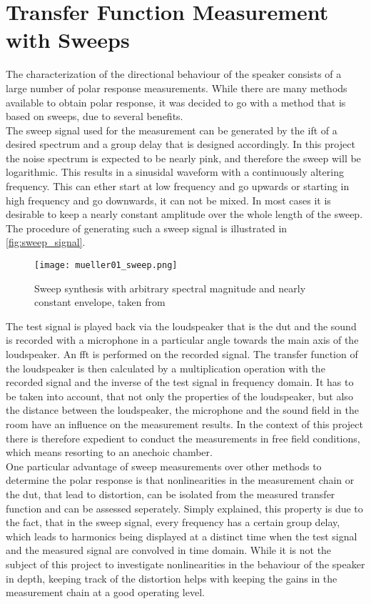 \section{Transfer Function Measurement with Sweeps}\label{sec:sweep_theorie}
The characterization of the directional behaviour of the speaker consists of a large number of polar response measurements. While there are many methods available to obtain polar response, it was decided to go with a method that is based on sweeps, due to several benefits. \citep[p. 3 ff.]{mueller01}\\
The sweep signal used for the measurement can be generated by the \gls{ift} of a desired spectrum and a group delay that is designed accordingly. In this project the noise spectrum is expected to be nearly pink, and therefore the sweep will be logarithmic. This results in a sinusidal waveform with a continuously altering frequency. This can ether start at low frequency and go upwards or starting in high frequency and go downwards, it can not be mixed. In most cases it is desirable to keep a nearly constant amplitude over the whole length of the sweep. The procedure of generating such a sweep signal is illustrated in \autoref{fig:sweep_signal}.

\begin{figure}[htbp]
	\centering
	\texttt{[image: mueller01\_sweep.png]}
	\caption{Sweep synthesis with arbitrary spectral magnitude and nearly constant envelope, taken from \citep{mueller01}}
		\label{fig:sweep_signal}
\end{figure}

The test signal is played back via the loudspeaker that is the \gls{dut} and the sound is recorded with a microphone in a particular angle towards the main axis of the loudspeaker. An \gls{fft} is performed on the recorded signal. The transfer function of the loudspeaker is then calculated by a multiplication operation with the recorded signal and the inverse of the test signal in frequency domain. It has to be taken into account, that not only the properties of the loudspeaker, but also the distance between the loudspeaker, the microphone and the sound field in the room have an influence on the measurement results. In the context of this project there is therefore expedient to conduct the measurements in free field conditions, which means resorting to an anechoic chamber.\\
One particular advantage of sweep measurements over other methods to determine the polar response is that nonlinearities in the measurement chain or the \gls{dut}, that lead to distortion, can be isolated from the measured transfer function and can be assessed seperately. \citep[p. 20 f.]{mueller01} Simply explained, this property is due to the fact, that in the sweep signal, every frequency has a certain group delay, which leads to harmonics being displayed at a distinct time when the test signal and the measured signal are convolved in time domain. While it is not the subject of this project to investigate nonlinearities in the behaviour of the speaker in depth, keeping track of the distortion helps with keeping the gains in the measurement chain at a good operating level.

